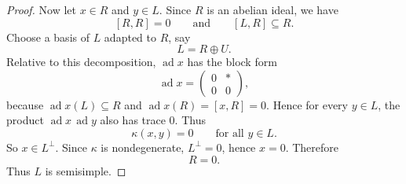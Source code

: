 \begin{proof}
    Now let $x\in R$ and $y\in L$. Since $R$ is an abelian ideal, we have
    \[
        [R,R]=0
        \qquad\text{and}\qquad
        [L,R]\subseteq R.
    \]
    Choose a basis of $L$ adapted to $R$, say
    \[
        L=R\oplus U.
    \]
    Relative to this decomposition, $\operatorname{ad}x$ has the block form
    \[
        \operatorname{ad}x=
        \begin{pmatrix}
            0 & * \\
            0 & 0
        \end{pmatrix},
    \]
    because $\operatorname{ad}x(L)\subseteq R$ and $\operatorname{ad}x(R)=[x,R]=0$.
    Hence for every $y\in L$, the product $\operatorname{ad}x\,\operatorname{ad}y$ also has trace $0$. Thus
    \[
        \kappa(x,y)=0
        \qquad\text{for all }y\in L.
    \]
    So $x\in L^\perp$. Since $\kappa$ is nondegenerate, $L^\perp=0$, hence $x=0$. Therefore
    \[
        R=0.
    \]
    Thus $L$ is semisimple.
\end{proof}

